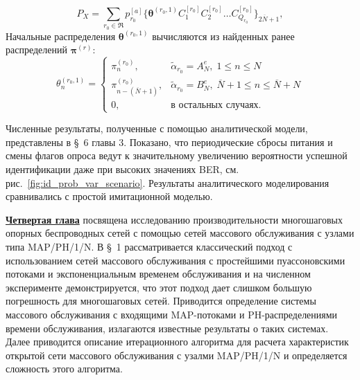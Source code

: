 $$
	P_X = \sum\limits_{r_0 \in \mathfrak{R}} p_{r_0}^{[a]} \{ \bm{\theta}^{(r_0,1)} C_1^{[r_0]} C_2^{[r_0]} \dots C_{Q_{r_0}}^{[r_0]} \}_{2\overline{N}+1},
$$
Начальные распределения $\bm{\theta}^{(r_0,1)}$ вычисляются из найденных ранее распределений $\bm{\pi}^{(r)}$:
$$
  \theta_n^{(r_0,1)} = \begin{cases}
    \pi^{(r_0)}_n,                      &\widetilde{\alpha}_{r_0} = A^e_N,\; 1 \leqslant n \leqslant N\\
    \pi^{(r_0)}_{n - (\overline{N}+1)}, &\widetilde{\alpha}_{r_0} = B^e_N,\; \overline{N}+1 \leqslant n \leqslant \overline{N}+N\\
    0,                                  &\text{в остальных случаях.}
  \end{cases}
$$


Численные результаты, полученные с помощью аналитической модели, представлены в \S~6 главы 3. Показано, что периодические сбросы питания и смены флагов опроса ведут к значительному увеличению вероятности успешной идентификации даже при высоких значениях BER, см. рис.~\ref{fig:id_prob_var_scenario}. Результаты аналитического моделирования сравнивались с простой имитационной моделью.



\underline{\textbf{Четвертая глава}} посвящена исследованию производительности многошаговых опорных беспроводных сетей с помощью сетей массового обслуживания с узлами типа MAP/PH/1/N. В \S~1 рассматривается классический подход с использованием сетей массового обслуживания с простейшими пуассоновскими потоками и экспоненциальным временем обслуживания и на численном эксперименте демонстрируется, что этот подход дает слишком большую погрешность для многошаговых сетей. Приводится определение системы массового обслуживания с входящими MAP-потоками и PH-распределениями времени обслуживания, излагаются известные результаты о таких системах. Далее приводится описание итерационного алгоритма для расчета характеристик открытой сети массового обслуживания с узалми MAP/PH/1/N и определяется сложность этого алгоритма.

